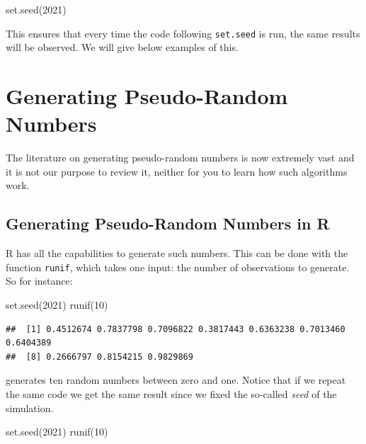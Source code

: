 \documentclass[
]{book}
\newenvironment{Shaded}{\begin{snugshade}}{\end{snugshade}}
\newcommand{\DecValTok}[1]{\textcolor[rgb]{0.00,0.00,0.81}{#1}}
\newcommand{\FunctionTok}[1]{\textcolor[rgb]{0.00,0.00,0.00}{#1}}
\newcommand{\NormalTok}[1]{#1}
\begin{document}
\begin{Shaded}
\begin{Highlighting}[]
\FunctionTok{set.seed}\NormalTok{(}\DecValTok{2021}\NormalTok{)}
\end{Highlighting}
\end{Shaded}

This ensures that every time the code following \texttt{set.seed} is run, the same results will be observed. We will give below examples of this.

\hypertarget{generating-pseudo-random-numbers}{%
\section{Generating Pseudo-Random Numbers}\label{generating-pseudo-random-numbers}}

The literature on generating pseudo-random numbers is now extremely vast and it is not our purpose to review it, neither for you to learn how such algorithms work.

\hypertarget{generating-pseudo-random-numbers-in-r}{%
\subsection{Generating Pseudo-Random Numbers in R}\label{generating-pseudo-random-numbers-in-r}}

R has all the capabilities to generate such numbers. This can be done with the function \texttt{runif}, which takes one input: the number of observations to generate. So for instance:

\begin{Shaded}
\begin{Highlighting}[]
\FunctionTok{set.seed}\NormalTok{(}\DecValTok{2021}\NormalTok{)}
\FunctionTok{runif}\NormalTok{(}\DecValTok{10}\NormalTok{)}
\end{Highlighting}
\end{Shaded}

\begin{verbatim}
##  [1] 0.4512674 0.7837798 0.7096822 0.3817443 0.6363238 0.7013460 0.6404389
##  [8] 0.2666797 0.8154215 0.9829869
\end{verbatim}

generates ten random numbers between zero and one. Notice that if we repeat the same code we get the same result since we fixed the so-called \emph{seed} of the simulation.

\begin{Shaded}
\begin{Highlighting}[]
\FunctionTok{set.seed}\NormalTok{(}\DecValTok{2021}\NormalTok{)}
\FunctionTok{runif}\NormalTok{(}\DecValTok{10}\NormalTok{)}
\end{Highlighting}
\end{Shaded}
\end{document}

